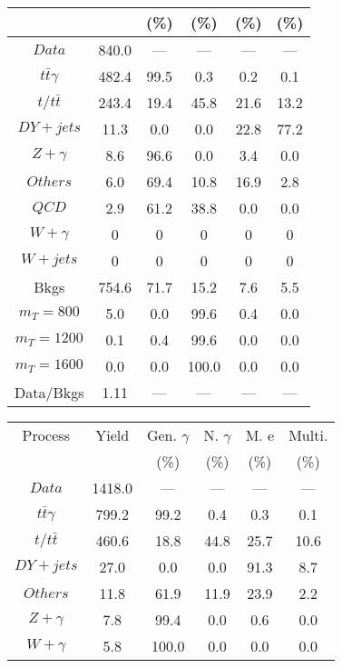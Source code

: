 \begin{figure}
\begin{minipage}[c]{0.32\textwidth}
{\begin{tabular}{cccccc}
 &  & (\%) & (\%) & (\%) & (\%)  \\
\hline
                                                                      $ Data $ &  840.0 &  --- &  --- &  --- &  ---\\
$ t\bar{t}\gamma $ &  482.4 &  99.5 &  0.3 &  0.2 &  0.1\\
$ t/t\bar{t} $ &  243.4 &  19.4 &  45.8 &  21.6 &  13.2\\
$ DY+jets $ &  11.3 &  0.0 &  0.0 &  22.8 &  77.2\\
$ Z+\gamma $ &  8.6 &  96.6 &  0.0 &  3.4 &  0.0\\
$ Others $ &  6.0 &  69.4 &  10.8 &  16.9 &  2.8\\
$ QCD $ &  2.9 &  61.2 &  38.8 &  0.0 &  0.0\\
$ W+\gamma $ &  0 &  0 &  0 &  0 &  0\\
$ W+jets $ &  0 &  0 &  0 &  0 &  0\\
Bkgs &  754.6 &  71.7 &  15.2 &  7.6 &  5.5\\
$ m_{T} = 800 $ &  5.0 &  0.0 &  99.6 &  0.4 &  0.0\\
$ m_{T} = 1200 $ &  0.1 &  0.4 &  99.6 &  0.0 &  0.0\\
$ m_{T} = 1600 $ &  0.0 &  0.0 &  100.0 &  0.0 &  0.0\\
Data/Bkgs &  1.11 &  --- &  --- &  --- &  ---\\
\hline
\end{tabular}
}
\end{minipage}
\begin{minipage}[c]{0.32\textwidth}
\centering
\tiny{
\begin{tabular}{cccccc}
\hline
Process & Yield & Gen. $\gamma$ & N. $\gamma$ & M. e & Multi. \\
 &  & (\%) & (\%) & (\%) & (\%)  \\
\hline
                                                                      $ Data $ &  1418.0 &  --- &  --- &  --- &  ---\\
$ t\bar{t}\gamma $ &  799.2 &  99.2 &  0.4 &  0.3 &  0.1\\
$ t/t\bar{t} $ &  460.6 &  18.8 &  44.8 &  25.7 &  10.6\\
$ DY+jets $ &  27.0 &  0.0 &  0.0 &  91.3 &  8.7\\
$ Others $ &  11.8 &  61.9 &  11.9 &  23.9 &  2.2\\
$ Z+\gamma $ &  7.8 &  99.4 &  0.0 &  0.6 &  0.0\\
$ W+\gamma $ &  5.8 &  100.0 &  0.0 &  0.0 &  0.0\\

\end{tabular}}
\end{minipage}
\end{figure}

